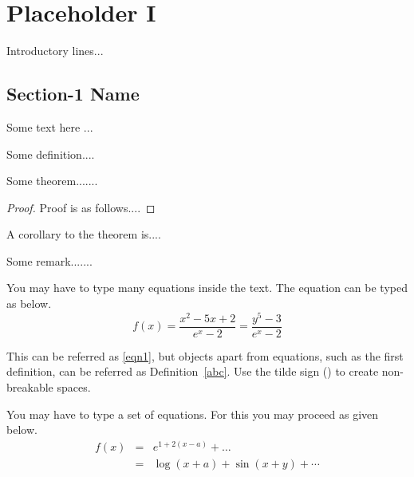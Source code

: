 \chapter{Placeholder I}

Introductory lines...



\section{Section-1 Name}

Some text here ...

\begin{definition}\label{abc}
Some definition....
\end{definition}

\begin{theorem}
Some theorem.......
\end{theorem}

\begin{proof}
Proof is as follows....
\end{proof}


\begin{corollary}
A corollary to the theorem is....
\end{corollary}

\begin{remark}
Some remark.......
\end{remark}


You may have to type many equations inside the text.  The equation can be typed as below.
\begin{equation}\label{eqn1}
f(x) = \frac{x^2-5x+2}{e^x - 2} = \frac{y^5-3}{e^x-2} %
\end{equation}

This can be referred as \eqref{eqn1}, but objects apart from equations, such as the first definition, can be referred as Definition~\ref{abc}. Use the tilde sign (\texttildelow) to create non-breakable spaces.

You may have to type a set of equations.  For this you may proceed as given below.
\begin{eqnarray}
f(x) &=& e^{1+2(x-a)} + \ldots   \nonumber   \\
  &=& \log(x+a) + \sin(x+y) + \cdots  \label{eqn2}
\end{eqnarray}


